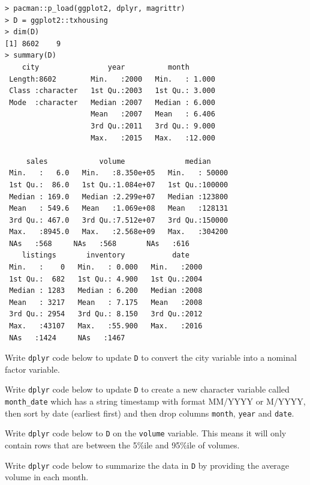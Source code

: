 \documentclass[12pt]{article}
\begin{document}
\lstset{basicstyle=\footnotesize}
\begin{lstlisting}
> pacman::p_load(ggplot2, dplyr, magrittr)
> D = ggplot2::txhousing
> dim(D)
[1] 8602    9
> summary(D)
    city                year          month       
 Length:8602        Min.   :2000   Min.   : 1.000  
 Class :character   1st Qu.:2003   1st Qu.: 3.000  
 Mode  :character   Median :2007   Median : 6.000  
                    Mean   :2007   Mean   : 6.406  
                    3rd Qu.:2011   3rd Qu.: 9.000  
                    Max.   :2015   Max.   :12.000  
                                                   
     sales            volume              median      
 Min.   :   6.0   Min.   :8.350e+05   Min.   : 50000  
 1st Qu.:  86.0   1st Qu.:1.084e+07   1st Qu.:100000  
 Median : 169.0   Median :2.299e+07   Median :123800  
 Mean   : 549.6   Mean   :1.069e+08   Mean   :128131  
 3rd Qu.: 467.0   3rd Qu.:7.512e+07   3rd Qu.:150000  
 Max.   :8945.0   Max.   :2.568e+09   Max.   :304200  
 NAs   :568     NAs   :568       NAs   :616     
    listings       inventory           date     
 Min.   :    0   Min.   : 0.000   Min.   :2000  
 1st Qu.:  682   1st Qu.: 4.900   1st Qu.:2004  
 Median : 1283   Median : 6.200   Median :2008  
 Mean   : 3217   Mean   : 7.175   Mean   :2008  
 3rd Qu.: 2954   3rd Qu.: 8.150   3rd Qu.:2012  
 Max.   :43107   Max.   :55.900   Max.   :2016  
 NAs   :1424     NAs   :1467                   
\end{lstlisting}
\vspace{-1cm}

\benum

 Write \texttt{dplyr} code below to update \texttt{D} to convert the city variable into a nominal factor variable. 

 Write \texttt{dplyr} code below to update \texttt{D} to create a new character variable called \texttt{month\_date} which has a string timestamp with format MM/YYYY or M/YYYY, then sort by date (earliest first) and then drop columns \texttt{month}, \texttt{year} and \texttt{date}. 

 Write \texttt{dplyr} code below to  \texttt{D} on the \texttt{volume} variable. This means it will only contain rows that are between the 5\%ile and 95\%ile of volumes. 

 Write \texttt{dplyr} code below to summarize the data in \texttt{D} by providing the average volume in each month. 
\end{document}
